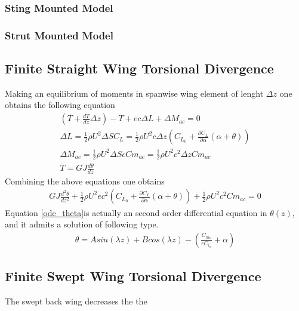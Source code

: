 \subsubsection{Sting Mounted Model}

\subsubsection{Strut Mounted Model}

\subsection{Finite Straight Wing Torsional Divergence}
Making an equilibrium of moments in spanwise wing element of lenght $\Delta z$ one obtains the following equation
\begin{align}
\left( T+\frac{d T}{d z}\Delta z \right)-T +ec\Delta L + \Delta M_{ac}=0\\
\Delta L= \frac{1}{2} \rho U^2 \Delta S C_L = \frac{1}{2} \rho U^2 c \Delta z \left( C_{L_0} + \frac{\partial C_L}{\partial \alpha}(\alpha + \theta) \right)\\
\Delta M_{ac}= \frac{1}{2} \rho U^2 \Delta S c Cm_{ac} = \frac{1}{2} \rho U^2 c^2 \Delta z Cm_{ac}\\
T=GJ \frac{d \theta}{dz}
\end{align}
Combining the above equations one obtains
\begin{align}
GJ\frac{d^2 \theta}{dz^2} + \frac{1}{2} \rho U^2 ec^2 \left( C_{L_0} + \frac{\partial C_L}{\partial \alpha}(\alpha + \theta) \right) + \frac{1}{2} \rho U^2 c^2 Cm_{ac}=0 \label{ode_theta}
\end{align}
Equation \eqref{ode_theta}is actually an second order differential equation in $\theta(z)$, and it admits a solution of following type.
\begin{align}
\theta= A sin(\lambda z) + B cos(\lambda z) - \left(\frac{C_{m_0}}{e C_{l_\alpha}} + \alpha \right)
\end{align}




\subsection{Finite Swept Wing Torsional Divergence}
The swept back wing decreases the the

